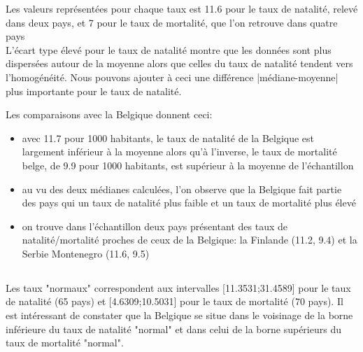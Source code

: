 \documentclass[a4paper,10pt]{article}
\begin{document}
Les valeurs représentées pour chaque taux est 11.6 pour le taux de natalité, relevé dans deux pays, et 7 pour le taux de mortalité, que l'on retrouve dans quatre pays
\\
L'écart type élevé pour le taux de natalité montre que les données sont plus dispersées autour de la moyenne alors que celles du taux de natalité tendent vers l'homogénéité. Nous pouvons ajouter à ceci une différence |médiane-moyenne| plus importante pour le taux de natalité.

Les comparaisons avec la Belgique donnent ceci: 

\begin{itemize}
	\item avec 11.7 pour 1000 habitants, le taux de natalité de la Belgique est largement inférieur à la moyenne alors qu'à l'inverse, le taux de mortalité belge, de 9.9 pour 1000 habitants, est supérieur à la moyenne de l'échantillon   
	\item au vu des deux médianes calculées, l'on observe que la Belgique fait partie des pays qui un taux de natalité plus faible et un taux de mortalité plus élevé
	\item on trouve dans l'échantillon deux pays présentant des taux de natalité/mortalité proches de ceux de la Belgique: la Finlande (11.2, 9.4) et la Serbie Montenegro (11.6, 9.5)
\end{itemize}


\subsection{ }

Les taux "normaux" correspondent aux intervalles [11.3531;31.4589] pour le taux de natalité (65 pays) et [4.6309;10.5031] pour le taux de mortalité (70 pays). Il est intéressant de constater que la Belgique se situe dans le voisinage de la borne inférieure du taux de natalité "normal" et dans celui de la borne supérieurs du taux de mortalité "normal". 

\subsection{ }
\end{document}
